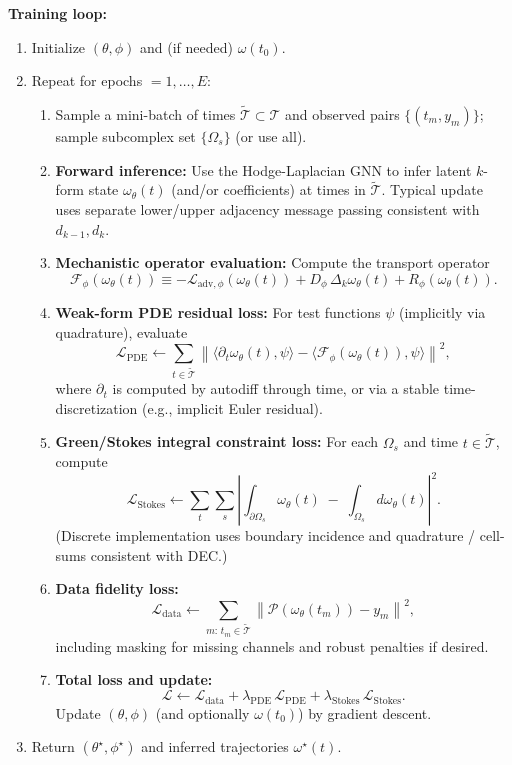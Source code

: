 \documentclass[10pt,article]{article}
\begin{document}
\medskip
\noindent\textbf{Training loop:}
\begin{enumerate}
\item Initialize $(\theta,\phi)$ and (if needed) $\omega(t_0)$.
\item Repeat for epochs $=1,\dots,E$:
\begin{enumerate}
\item Sample a mini-batch of times $\tilde{\mathcal{T}}\subset \mathcal{T}$ and observed pairs
$\{(t_m,y_m)\}$; sample subcomplex set $\{\Omega_s\}$ (or use all).
\item \textbf{Forward inference:} Use the Hodge-Laplacian GNN to infer latent $k$-form state
$\omega_\theta(t)$ (and/or coefficients) at times in $\tilde{\mathcal{T}}$.
Typical update uses separate lower/upper adjacency message passing consistent with $d_{k-1},d_k$.
\item \textbf{Mechanistic operator evaluation:}
Compute the transport operator
\[
\mathcal{F}_{\phi}(\omega_\theta(t)) \equiv
-\mathcal{L}_{\mathrm{adv},\phi}(\omega_\theta(t))
+ D_{\phi}\,\Delta_k \omega_\theta(t)
+ R_{\phi}(\omega_\theta(t)).
\]
\item \textbf{Weak-form PDE residual loss:}
For test functions $\psi$ (implicitly via quadrature),
evaluate
\[
\mathcal{L}_{\mathrm{PDE}} \leftarrow
\sum_{t\in\tilde{\mathcal{T}}}
\left\|
\langle \partial_t \omega_\theta(t), \psi\rangle
-
\langle \mathcal{F}_{\phi}(\omega_\theta(t)), \psi\rangle
\right\|^2,
\]
where $\partial_t$ is computed by autodiff through time, or via a stable time-discretization
(e.g., implicit Euler residual).
\item \textbf{Green/Stokes integral constraint loss:}
For each $\Omega_s$ and time $t\in\tilde{\mathcal{T}}$, compute
\[
\mathcal{L}_{\mathrm{Stokes}} \leftarrow
\sum_{t}\sum_{s}
\left|
\int_{\partial\Omega_s} \omega_\theta(t) \;-\;
\int_{\Omega_s} d\omega_\theta(t)
\right|^2.
\]
(Discrete implementation uses boundary incidence and quadrature / cell-sums consistent with DEC.)
\item \textbf{Data fidelity loss:}
\[
\mathcal{L}_{\mathrm{data}} \leftarrow
\sum_{m:\,t_m\in\tilde{\mathcal{T}}}
\left\|\mathcal{P}(\omega_\theta(t_m)) - y_m\right\|^2,
\]
including masking for missing channels and robust penalties if desired.
\item \textbf{Total loss and update:}
\[
\mathcal{L} \leftarrow
\mathcal{L}_{\mathrm{data}}
+ \lambda_{\mathrm{PDE}}\,\mathcal{L}_{\mathrm{PDE}}
+ \lambda_{\mathrm{Stokes}}\,\mathcal{L}_{\mathrm{Stokes}}.
\]
Update $(\theta,\phi)$ (and optionally $\omega(t_0)$) by gradient descent.
\end{enumerate}
\item Return $(\theta^\star,\phi^\star)$ and inferred trajectories $\omega^\star(t)$.
\end{enumerate}
\end{document}
